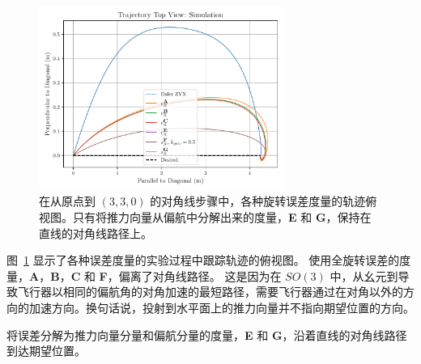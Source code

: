 \begin{figure}
  \begin{center}
  \includegraphics[width=8cm]{media/diagstep/topview.pdf}
  \caption{在从原点到 $(3, 3, 0)$ 的对角线步骤中，各种旋转误差度量的轨迹俯视图。只有将推力向量从偏航中分解出来的度量，\textbf{E} 和 \textbf{G}，保持在直线的对角线路径上。}
  \label{fig:ds_top}
  \end{center}
\end{figure}

图~\ref{fig:ds_top} 显示了各种误差度量的实验过程中跟踪轨迹的俯视图。
使用全旋转误差的度量，\textbf{A}，\textbf{B}，\textbf{C} 和 \textbf{F}，偏离了对角线路径。
这是因为在 $SO(3)$ 中，从幺元到导致飞行器以相同的偏航角的对角加速的最短路径，需要飞行器通过在对角以外的方向的加速方向。换句话说，投射到水平面上的推力向量并不指向期望位置的方向。

将误差分解为推力向量分量和偏航分量的度量，\textbf{E} 和 \textbf{G}，沿着直线的对角线路径到达期望位置。
